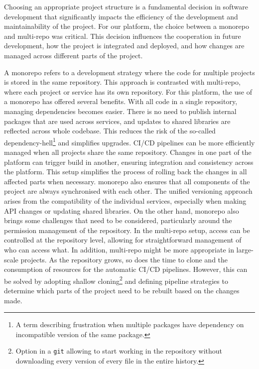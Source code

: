Choosing an appropriate project structure is a fundamental decision in software development that significantly impacts the efficiency of the development and maintainability of the project.
For our platform, the choice between a \ac{monorepo} and \ac{multi-repo} was critical.
This decision influences the cooperation in future development, how the project is integrated and deployed, and how changes are managed across different parts of the project.

A \ac{monorepo} refers to a development strategy where the code for multiple projects is stored in the same repository.
This approach is contrasted with \ac{multi-repo}, where each project or service has its own repository.
For this platform, the use of a monorepo has offered several benefits.
With all code in a single repository, managing dependencies becomes easier.
There is no need to publish internal packages that are used across services, and updates to shared libraries are reflected across whole codebase.
This reduces the risk of the so-called dependency-hell\footnote{A term describing frustration when multiple packages have dependency on incompatible version of the same package.} and simplifies upgrades.
\ac{CI}/\ac{CD} pipelines can be more efficiently managed when all projects share the same repository. Changes in one part of the platform can trigger build in another, ensuring integration and consistency across the platform. 
This setup simplifies the process of rolling back the changes in all affected parts when necessary.
\Ac{monorepo} also ensures that all components of the project are always synchronised with each other. The unified versioning approach arises from the compatibility of the individual services, especially when making API changes or updating shared libraries.
On the other hand, \ac{monorepo} also brings some challenges that need to be considered, particularly around the permission management of the repository.
In the \ac{multi-repo} setup, access can be controlled at the repository level, allowing for straightforward management of who can access what.
In addition, \ac{multi-repo} might be more appropriate in large-scale projects.
As the repository grows, so does the time to clone and the consumption of resources for the automatic \ac{CI}/\ac{CD} pipelines.
However, this can be solved by adopting shallow cloning\footnote{Option in a \texttt{git} allowing to start working in the repository without downloading every version of every file in the entire history.} and defining pipeline strategies to determine which parts of the project need to be rebuilt based on the changes made.

